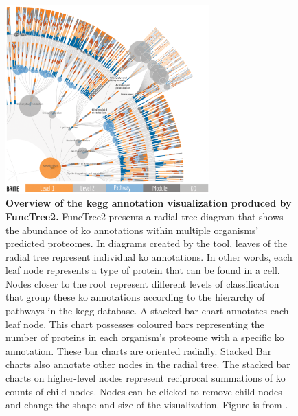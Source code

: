 \begin{figure}[!ht]
 \centering
	\includegraphics[width=0.7\textwidth]{media/functree2.png}
	 \caption[Overview of the KEGG annotation visualization produced by 
FuncTree2.]{\textbf{Overview of the \gls{kegg} annotation visualization produced 
by FuncTree2.} FuncTree2 presents a radial tree diagram that shows the abundance 
of \gls{ko} annotations within multiple organisms' predicted proteomes. In 
diagrams created by the tool, leaves of the radial tree represent individual 
\gls{ko} annotations. In other words, each leaf node represents a type of 
protein that can be found in a cell. Nodes closer to the root represent 
different levels of classification that group these \gls{ko} annotations 
according to the hierarchy of pathways in the \gls{kegg} database. A stacked bar 
chart annotates each leaf node. This chart possesses coloured bars representing 
the number of proteins in each organism's proteome with a specific \gls{ko} 
annotation. These bar charts are oriented radially. Stacked Bar charts also 
annotate other nodes in the radial tree. The stacked bar charts on higher-level 
nodes represent reciprocal summations of \gls{ko} counts of child nodes. Nodes 
can be clicked to remove child nodes and change the shape and size of the 
visualization. Figure is from \cite{darzi2019functree2}.}
	 \label{fig:functree2}
\end{figure}

